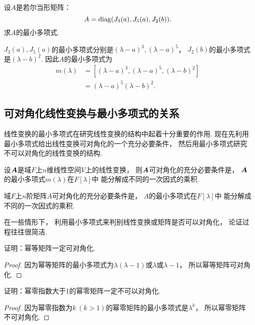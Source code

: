 \begin{example}
设\(A\)是若尔当形矩阵：\[
	A = \operatorname{diag}(J_3(a),J_5(a),J_2(b)).
\]
求\(A\)的最小多项式.
\begin{solution}
\(J_3(a),J_5(a)\)的最小多项式分别是\((\lambda-a)^3,(\lambda-a)^5\)，
\(J_2(b)\)的最小多项式是\((\lambda-b)^2\).
因此\(A\)的最小多项式为\begin{align*}
	m(\lambda)
	&= [(\lambda-a)^3,(\lambda-a)^5,(\lambda-b)^2] \\
	&= (\lambda-a)^5(\lambda-b)^2.
\end{align*}
\end{solution}
\end{example}

\subsection{可对角化线性变换与最小多项式的关系}
线性变换的最小多项式在研究线性变换的结构中起着十分重要的作用.
现在先利用最小多项式给出线性变换可对角化的一个充分必要条件，
然后用最小多项式研究不可以对角化的线性变换的结构.

\begin{theorem}
设\(\boldsymbol{A}\)是域\(F\)上\(n\)维线性空间\(V\)上的线性变换，
则\(\boldsymbol{A}\)可对角化的充分必要条件是，
\(\boldsymbol{A}\)的最小多项式\(m(\lambda)\)在\(F[\lambda]\)中
能分解成不同的一次因式的乘积.
\end{theorem}

\begin{corollary}
域\(F\)上\(n\)阶矩阵\(A\)可对角化的充分必要条件是，
\(A\)的最小多项式在\(F[\lambda]\)中
能分解成不同的一次因式的乘积.
\end{corollary}
\begin{remark}
在一些情形下，
利用最小多项式来判别线性变换或矩阵是否可以对角化，
论证过程往往很简洁.
\end{remark}

\begin{example}
证明：幂等矩阵一定可对角化.
\begin{proof}
因为幂等矩阵的最小多项式为\(\lambda(\lambda-1)\)或\(\lambda\)或\(\lambda-1\)，
所以幂等矩阵可对角化.
\end{proof}
\end{example}

\begin{example}
证明：幂零指数大于1的幂零矩阵一定不可以对角化.
\begin{proof}
因为幂零指数为\(k\ (k>1)\)的幂零矩阵的最小多项式是\(\lambda^k\)，
所以幂零矩阵不可对角化.
\end{proof}
\end{example}

